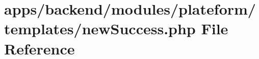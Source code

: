 \hypertarget{backend_2modules_2plateform_2templates_2new_success_8php}{\section{apps/backend/modules/plateform/templates/new\-Success.php File Reference}
\label{backend_2modules_2plateform_2templates_2new_success_8php}
}
